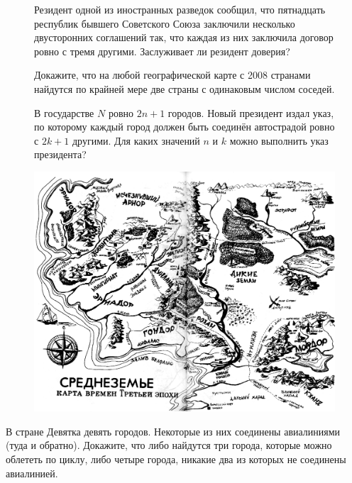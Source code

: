 {\setlength{\intextsep}{2pt}
\begin{figure}[h]
\begin{minipage}{0.62\linewidth}\setlength{\parindent}{1.5em}
\begin{thm}
    Резидент одной из иностранных разведок сообщил, что пятнадцать республик бывшего Советского Союза заключили несколько двусторонних соглашений так, что каждая из них заключила договор ровно с тремя другими. Заслуживает ли резидент доверия?
\end{thm}

\begin{thm}
    Докажите, что на любой географической карте с 2008 странами найдутся по крайней мере две страны с одинаковым числом соседей.
\end{thm}

\begin{thm}
    В государстве $N$ ровно $2n + 1$ городов. Новый президент издал указ, по которому каждый город должен быть соединён автострадой ровно с $2k + 1$ другими. Для каких значений $n$ и $k$ можно выполнить указ президента?
\end{thm}
\end{minipage}
\hfill
\begin{minipage}{0.37\linewidth}
    \includegraphics[width=1\columnwidth]{img/map.png}
\end{minipage}
\end{figure}}

\begin{thm}
    В стране Девятка девять городов. Некоторые из них соединены авиалиниями (туда и обратно). Докажите, что либо найдутся три города, которые можно облететь по циклу, либо четыре города, никакие два из которых не соединены авиалинией.
\end{thm}

